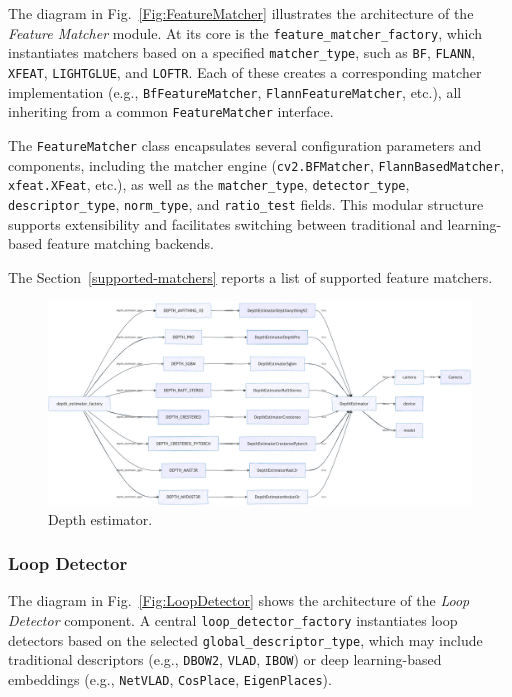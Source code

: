 \documentclass{article}
\begin{document}
The diagram in Fig.~\ref{Fig:FeatureMatcher} illustrates the architecture of the \textit{Feature Matcher} module. At its core is the \texttt{feature\_matcher\_factory}, which instantiates matchers based on a specified \texttt{matcher\_type}, such as \texttt{BF}, \texttt{FLANN}, \texttt{XFEAT}, \texttt{LIGHTGLUE}, and \texttt{LOFTR}. Each of these creates a corresponding matcher implementation (e.g., \texttt{BfFeatureMatcher}, \texttt{FlannFeatureMatcher}, etc.), all inheriting from a common \texttt{FeatureMatcher} interface.

The \texttt{FeatureMatcher} class encapsulates several configuration parameters and components, including the matcher engine (\texttt{cv2.BFMatcher}, \texttt{FlannBasedMatcher}, \texttt{xfeat.XFeat}, etc.), as well as the \texttt{matcher\_type}, \texttt{detector\_type}, \texttt{descriptor\_type}, \texttt{norm\_type}, and \texttt{ratio\_test} fields. This modular structure supports extensibility and facilitates switching between traditional and learning-based feature matching backends.

The Section~\ref{supported-matchers} reports a list of supported feature matchers. 


\begin{figure}[!t]
\begin{center}
    \includegraphics[width=\textwidth]{./images/depth_estimator.png}
\end{center}
\caption{Depth estimator.}
\label{Fig:DepthEstimator}
\end{figure}


\subsubsection{Loop Detector}

The diagram in Fig.~\ref{Fig:LoopDetector} shows the architecture of the \textit{Loop Detector} component. A central \texttt{loop\_detector\_factory} instantiates loop detectors based on the selected \texttt{global\_descriptor\_type}, which may include traditional descriptors (e.g., \texttt{DBOW2}, \texttt{VLAD}, \texttt{IBOW}) or deep learning-based embeddings (e.g., \texttt{NetVLAD}, \texttt{CosPlace}, \texttt{EigenPlaces}).
\end{document}
